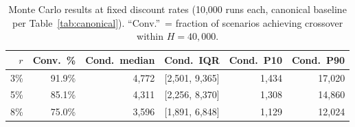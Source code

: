 \begin{table}[htbp]
\centering
\caption{Monte Carlo results at fixed discount rates (10{,}000 runs each, canonical baseline per Table~\ref{tab:canonical}). ``Conv.''\ = fraction of scenarios achieving crossover within $H = 40{,}000$.}
\label{tab:mc_summary}
\small
\begin{tabular}{@{}rrrrrr@{}}
\toprule
$r$ & Conv.\ \% & Cond.\ median & Cond.\ IQR & Cond.\ P10 & Cond.\ P90 \\
\midrule
3\%  & 91.9\% & 4{,}772 & [2{,}501, 9{,}365] & 1{,}434 & 17{,}020 \\
5\%  & 85.1\% & 4{,}311 & [2{,}256, 8{,}370]  & 1{,}308 & 14{,}860 \\
8\%  & 75.0\% & 3{,}596 & [1{,}891, 6{,}848]  & 1{,}129 & 12{,}024 \\
\bottomrule
\end{tabular}
\end{table}
